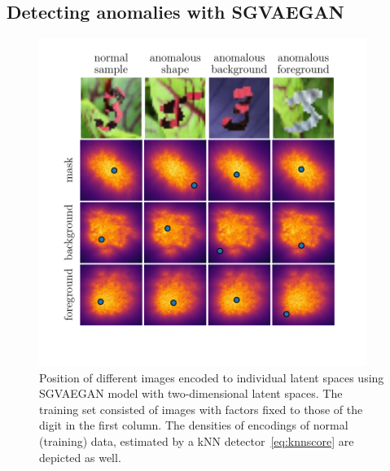 \subsection{Detecting anomalies with SGVAEGAN} \label{sec:anomaly_detection}

\begin{figure}[ht!]
    \centering
        \includegraphics[width=0.95\textwidth]{data/chapter_sgvaegan/fig3_latent_decomposition_example.pdf}
    \caption{Position of different images encoded to individual latent spaces using SGVAEGAN model with two-dimensional latent spaces. The training set consisted of images with factors fixed to those of the digit in the first column. The densities of encodings of normal (training) data, estimated by a kNN detector~\eqref{eq:knnscore} are depicted as well.}
    \label{fig:latent_decomposition_example}
\end{figure}

